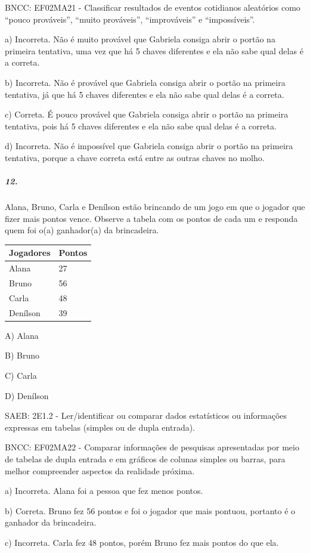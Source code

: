 BNCC: EF02MA21 - Classificar resultados de eventos cotidianos aleatórios
como ``pouco prováveis'', ``muito prováveis'', ``improváveis'' e
``impossíveis''.

a) Incorreta. Não é muito provável que Gabriela consiga abrir o portão
na primeira tentativa, uma vez que há 5 chaves diferentes e ela não sabe
qual delas é a correta.

b) Incorreta. Não é provável que Gabriela consiga abrir o portão na
primeira tentativa, já que há 5 chaves diferentes e ela não sabe qual
delas é a correta.

c) Correta. É pouco provável que Gabriela consiga abrir o portão na
primeira tentativa, pois há 5 chaves diferentes e ela não sabe qual
delas é a correta.

d) Incorreta. Não é impossível que Gabriela consiga abrir o portão na
primeira tentativa, porque a chave correta está entre as outras chaves
no molho.

\subparagraph{12. }\label{section-111}

Alana, Bruno, Carla e Denílson estão brincando de um jogo em que o
jogador que fizer mais pontos vence. Observe a tabela com os pontos de
cada um e responda quem foi o(a) ganhador(a) da brincadeira.

\begin{longtable}[]{@{}ll@{}}
\toprule
Jogadores & Pontos\tabularnewline
\midrule
\endhead
Alana & 27\tabularnewline
Bruno & 56\tabularnewline
Carla & 48\tabularnewline
Denílson & 39\tabularnewline
\bottomrule
\end{longtable}

A) Alana

B) Bruno

C) Carla

D) Denílson

SAEB: 2E1.2 - Ler/identificar ou comparar dados estatísticos ou
informações expressas em tabelas (simples ou de dupla entrada).

BNCC: EF02MA22 - Comparar informações de pesquisas apresentadas por meio
de tabelas de dupla entrada e em gráficos de colunas simples ou barras,
para melhor compreender aspectos da realidade próxima.

a) Incorreta. Alana foi a pessoa que fez menos pontos.

b) Correta. Bruno fez 56 pontos e foi o jogador que mais pontuou,
portanto é o ganhador da brincadeira.

c) Incorreta. Carla fez 48 pontos, porém Bruno fez mais pontos do que
ela.

